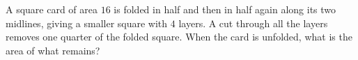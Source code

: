 A square card of area $16$ is folded in half and then in half again along its two midlines, giving a smaller square with $4$ layers. A cut through all the layers removes one quarter of the folded square. When the card is unfolded, what is the area of what remains?
